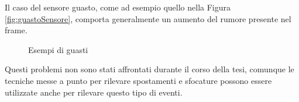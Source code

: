 Il caso del sensore guasto, come ad esempio quello nella Figura \ref{fig:guastoSensore}, comporta generalmente un aumento del rumore presente nel frame. \\
\begin{figure}[tb]
	\centering
	\caption{Esempi di guasti}
	\label{fig:guasti}
\end{figure}
Questi problemi non sono stati affrontati durante il corso della tesi, comunque le tecniche messe a punto per rilevare spostamenti e sfocature possono essere utilizzate anche per rilevare questo tipo di eventi. 
